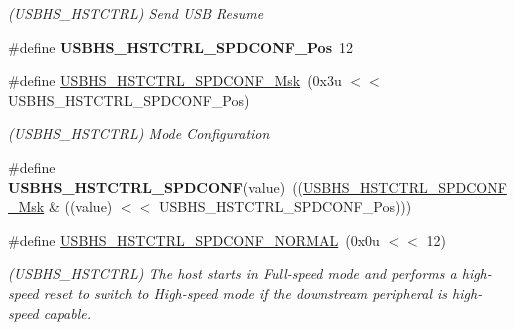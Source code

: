 \begin{DoxyCompactItemize}
\begin{DoxyCompactList}\small\item\em (U\+S\+B\+H\+S\+\_\+\+H\+S\+T\+C\+T\+RL) Send U\+SB Resume \end{DoxyCompactList}\item 
\mbox{\label{group__SAMV71__USBHS_ga3dbc1f0e1a120ea37ac7e126e5048c18}} 
\#define {\bfseries U\+S\+B\+H\+S\+\_\+\+H\+S\+T\+C\+T\+R\+L\+\_\+\+S\+P\+D\+C\+O\+N\+F\+\_\+\+Pos}~12
\item 
\mbox{\label{group__SAMV71__USBHS_gac7ec7fd901405a233ec5fc86a4c8cf33}} 
\#define \mbox{\hyperlink{group__SAMV71__USBHS_gac7ec7fd901405a233ec5fc86a4c8cf33}{U\+S\+B\+H\+S\+\_\+\+H\+S\+T\+C\+T\+R\+L\+\_\+\+S\+P\+D\+C\+O\+N\+F\+\_\+\+Msk}}~(0x3u $<$$<$ U\+S\+B\+H\+S\+\_\+\+H\+S\+T\+C\+T\+R\+L\+\_\+\+S\+P\+D\+C\+O\+N\+F\+\_\+\+Pos)
\begin{DoxyCompactList}\small\item\em (U\+S\+B\+H\+S\+\_\+\+H\+S\+T\+C\+T\+RL) Mode Configuration \end{DoxyCompactList}\item 
\mbox{\label{group__SAMV71__USBHS_gafa93266fe4a5db3f21621b544b3fcbf0}} 
\#define {\bfseries U\+S\+B\+H\+S\+\_\+\+H\+S\+T\+C\+T\+R\+L\+\_\+\+S\+P\+D\+C\+O\+NF}(value)~((\mbox{\hyperlink{group__SAMV71__USBHS_gac7ec7fd901405a233ec5fc86a4c8cf33}{U\+S\+B\+H\+S\+\_\+\+H\+S\+T\+C\+T\+R\+L\+\_\+\+S\+P\+D\+C\+O\+N\+F\+\_\+\+Msk}} \& ((value) $<$$<$ U\+S\+B\+H\+S\+\_\+\+H\+S\+T\+C\+T\+R\+L\+\_\+\+S\+P\+D\+C\+O\+N\+F\+\_\+\+Pos)))
\item 
\mbox{\label{group__SAMV71__USBHS_ga64e316d861e4536eeef786752d54af55}} 
\#define \mbox{\hyperlink{group__SAMV71__USBHS_ga64e316d861e4536eeef786752d54af55}{U\+S\+B\+H\+S\+\_\+\+H\+S\+T\+C\+T\+R\+L\+\_\+\+S\+P\+D\+C\+O\+N\+F\+\_\+\+N\+O\+R\+M\+AL}}~(0x0u $<$$<$ 12)
\begin{DoxyCompactList}\small\item\em (U\+S\+B\+H\+S\+\_\+\+H\+S\+T\+C\+T\+RL) The host starts in Full-\/speed mode and performs a high-\/speed reset to switch to High-\/speed mode if the downstream peripheral is high-\/speed capable. \end{DoxyCompactList}\item 
\mbox{\label{group__SAMV71__USBHS_gadf2f66676fae0988982122a3832dda2a}} 
$$
\end{DoxyCompactItemize}

